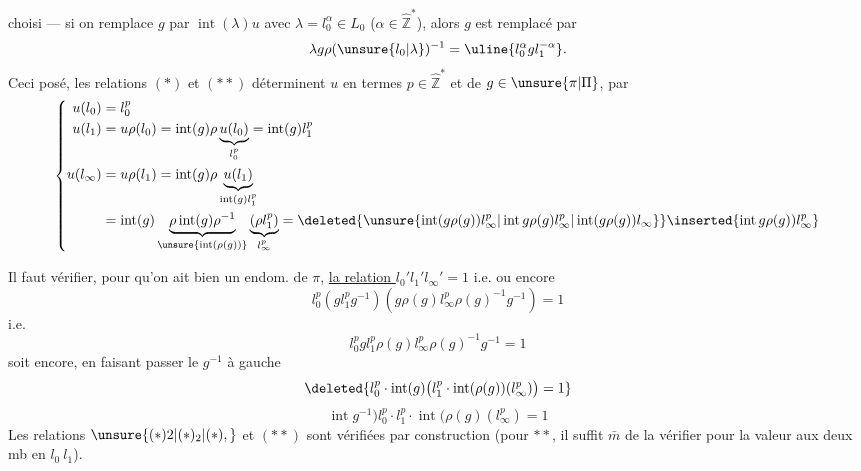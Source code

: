 choisi --- si on  remplace $g$ par $\operatorname{int}(\lambda)u$ avec $\lambda=l_0^\alpha\in L_0$ ($\alpha\in\hat{\mathbb Z}^{*}$), alors $g$ est remplacé par
\[
\lambda g\rho(\unsure{l_0|\lambda})^{-1}=\uline{l_0^\alpha gl_1^{-\alpha}}.
\]
Ceci posé,  les relations $(*)$ et $(**)$ déterminent $u$ en termes $p\in\hat{\mathbb Z}^{*}$ et de $g\in\unsure{\pi|\Pi}$, par
\[
\left\{\begin{aligned}
u(l_0)&=l_0^p\\
u(l_1)&=u\rho(l_0)=\operatorname{int}(g)\rho\underbrace{u(l_0)}_{l_0^p}=\operatorname{int}(g)l_1^p\\
u(l_\infty)&=u\rho(l_1)=\operatorname{int}(g)\rho\underbrace{u(l_1)}_{\operatorname{int}(g)l_1^p}\\
&=\operatorname{int}(g)\underbrace{\rho\operatorname{int}(g)\rho^{-1}}_{\unsure{\operatorname{int}(\rho(g))}}\underbrace{(\rho l_1^p)}_{l_\infty^p}
=\deleted{\unsure{\operatorname{int}(g\rho(g))l_\infty^p|\operatorname{int}g\rho(g)l_\infty^p|\operatorname{int}(g\rho(g))l_\infty}}\inserted{\operatorname{int}g\rho(g))l_\infty^p}
\end{aligned}\right.
\]

Il faut vérifier, pour qu'on ait bien un endom. de $\pi$, \uline{la relation $l_0'l_1'l_\infty'=1$} i.e.
ou encore
\[
l_0^p(gl_1^pg^{-1})(g\rho(g)l_\infty^p\rho(g)^{-1}g^{-1})=1
\]
i.e.
\[
l_0^pgl_1^p\rho(g)l_\infty^p\rho(g)^{-1}g^{-1}=1
\]
soit encore, en faisant passer le $g^{-1}$ à gauche
\[
\deleted{l_0^p\cdot\operatorname{int}(g)\bigl(l_1^p\cdot\operatorname{int}(\rho(g))(l_\infty^p)\bigr)=1}
\]
\[
\operatorname{int}g^{-1})l_0^p\cdot l_1^p\cdot\operatorname{int}(\rho(g)(l_\infty^p)=1
\]
Les relations $\unsure{(*)2|(*)_2|(*),}$ et $(**)$ sont vérifiées par construction (pour $**$, il suffit $\bar m$ de la vérifier pour la valeur aux deux mb en $l_0\ l_1$).
